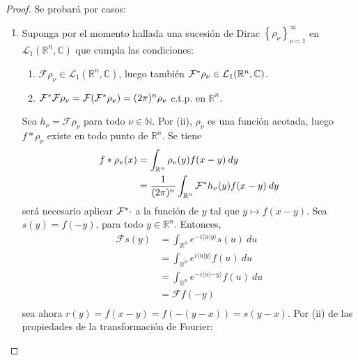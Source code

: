 \documentclass[12pt]{report}
\newcounter{it}
\theoremstyle{largebreak}
\newcommand\pint[2]{\ensuremath{\langle#1| #2\rangle}}
\newcommand{\fou}[1]{\ensuremath{\mathcal{F}#1}}
\begin{document}
    \begin{proof}
        Se probará por casos:
        \begin{enumerate}
            \item Suponga por el momento hallada una sucesión de Dirac $\left\{\rho_\nu\right\}_{\nu=1}^\infty$ en $\mathcal{L}_1(\mathbb{R}^n,\mathbb{C})$ que cumpla las condiciones:
            \begin{enumerate}
                \item $\fou{\rho_\nu}\in\mathcal{L}_1(\mathbb{R}^n,\mathbb{C})$, luego también $\fou^*{\rho_\nu}\in\mathcal{L}_1(\mathbb{R}^n,\mathbb{C})$.
                \item $\fou^*{\fou{\rho_\nu}}=\fou{(\fou^*{\rho_\nu})}=(2\pi)^n\rho_\nu$ c.t.p. en $\mathbb{R}^n$.
            \end{enumerate}
            Sea $h_\nu=\fou{\rho_\nu}$ para todo $\nu\in\mathbb{N}$. Por (ii), $\rho_\nu$ es una función acotada, luego $f*\rho_\nu$ existe en todo punto de $\mathbb{R}^n$. Se tiene
            \begin{equation*}
                \begin{split}
                    f*\rho_\nu(x)&=\int_{\mathbb{R}^n}\rho_\nu(y)f(x-y)\:dy\\
                    &=\frac{1}{(2\pi)^n}\int_{\mathbb{R}^n}\fou^*{h_\nu}(y)f(x-y)\:dy\\
                \end{split}
            \end{equation*}
            será necesario aplicar $\fou^*{\cdot}$ a la función de $y$ tal que $y\mapsto f(x-y)$. Sea $s(y)=f(-y)$, para todo $y\in\mathbb{R}^n$. Entonces,
            \begin{equation*}
                \begin{split}
                    \fou{s}(y)&=\int_{\mathbb{R}^n}e^{ -i\pint{u}{y}}s(u)\:du\\
                    &=\int_{\mathbb{R}^n}e^{i\pint{u}{y}}f(u)\:du\\
                    &=\int_{\mathbb{R}^n}e^{-i\pint{u}{-y}}f(u)\:du\\
                    &=\fou{f}(-y)\\
                \end{split}
            \end{equation*}
            sea ahora $r(y)=f(x-y)=f(-(y-x))=s(y-x)$. Por (ii) de las propiedades de la transformación de Fourier:
            \begin{equation*}

\end{equation*}
\end{enumerate}
\end{proof}
\end{document}
